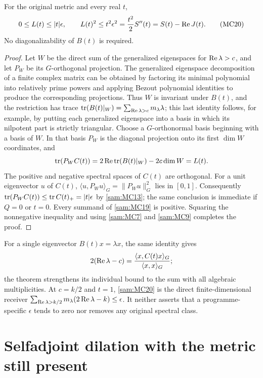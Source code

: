 \begin{samtheorem}
For the original metric and every real \(t\),
\begin{equation}
 0\le L(t)\le |t|\epsilon,\qquad
 L(t)^2\le t^2\epsilon^2
      =\frac{t^2}{2}S''(t)
      =S(t)-\operatorname{Re} J(t).
 \tag{MC20}\label{sam:MC20}
\end{equation}
No diagonalizability of \(B(t)\) is required.
\end{samtheorem}
\begin{proof}
Let \(W\) be the direct sum of the generalized eigenspaces for
\(\operatorname{Re}\lambda>c\), and let \(P_W\) be its \(G\)-orthogonal projection.
The generalized eigenspace decomposition of a finite complex matrix
can be obtained by factoring its minimal polynomial into relatively
prime powers and applying Bezout polynomial identities to produce the
corresponding projections. Thus \(W\) is invariant under \(B(t)\),
and the restriction has trace
\(\operatorname{tr}(B(t)|_W)=\sum_{\operatorname{Re}\lambda>c}m_\lambda\lambda\);
this last identity follows, for example, by putting each generalized
eigenspace into a basis in which its nilpotent part is strictly triangular.
Choose a \(G\)-orthonormal basis beginning with a basis of \(W\).
In that basis \(P_W\) is the diagonal projection onto its first
\(\dim W\) coordinates, and
\[
 \operatorname{tr}(P_W C(t))
   =2\operatorname{Re}\operatorname{tr}(B(t)|_W)-2c\dim W=L(t).
\]
The positive and negative spectral spaces of \(C(t)\) are orthogonal.
For a unit eigenvector \(u\) of \(C(t)\),
\(\langle u,P_Wu\rangle_G=\|P_Wu\|_G^2\) lies in \([0,1]\).
Consequently
\(\operatorname{tr}(P_W C(t))\le\operatorname{tr} C(t)_+=|t|\epsilon\) by \eqref{sam:MC13};
the same conclusion is immediate if \(Q=0\) or \(t=0\).
Every summand of \eqref{sam:MC19} is positive. Squaring the nonnegative
inequality and using \eqref{sam:MC7} and \eqref{sam:MC9} completes the proof.
\end{proof}

For a single eigenvector \(B(t)x=\lambda x\), the same identity gives
\[
 2(\operatorname{Re}\lambda-c)=
 \frac{\langle x,C(t)x\rangle_G}{\langle x,x\rangle_G};
\]
the theorem strengthens its individual bound to the sum with all
algebraic multiplicities. At \(c=k/2\) and \(t=1\),
\eqref{sam:MC20} is the direct finite-dimensional receiver
\(\sum_{\operatorname{Re}\lambda>k/2}m_\lambda(2\operatorname{Re}\lambda-k)\le\epsilon\).
It neither asserts that a programme-specific \(\epsilon\) tends to zero
nor removes any original spectral class.

\section{Selfadjoint dilation with the metric still present}

